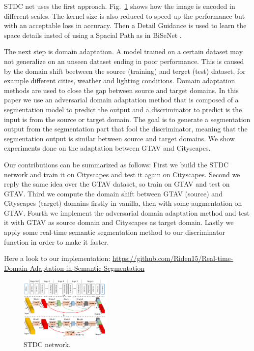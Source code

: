 \documentclass[conference]{IEEEtran}
\begin{document}
STDC net \cite{b1} uses the first approach. Fig.~\ref{stdc_net} shows how the image is encoded in different scales. The kernel size is also reduced
to speed-up the performance but with an acceptable loss in accuracy. Then a Detail Guidance is used to learn the space details insted of 
using a Spacial Path as in BiSeNet \cite{b2}.

The next step is domain adaptation. A model trained on a certain dataset may not generalize on an unseen dataset ending in poor performance.
This is caused by the domain shift beetween the source (training) and terget (test) dataset, for example different cities, weather and 
lighting conditions. Domain adaptation methods are used to close the gap between source and target domains. In this paper we use an 
adversarial domain adaptation method \cite{b3} that is composed of a segmentation model to predict the output and a discriminator to
predict is the input is from the source or target domain. The goal is to generate a segmentation output from the segmentation part that 
fool the discriminator, meaning that the segmentation output is similar between source and target domains. We show experiments done on 
the adaptation between GTAV and Cityscapes.

Our contributions can be summarized as follows:
First we build the STDC network and train it on Cityscapes and test it again on Cityscapes. Second we reply the same idea over the 
GTAV dataset, so train on GTAV and test on GTAV. Third we compute the domain shift between GTAV (source) and Cityscapes (target) domains
firstly in vanilla, then with some augmentation on GTAV. Fourth we implement the adversarial domain adaptation method and test it 
with GTAV as source domain and Cityscapes as target domain. Lastly we apply some real-time semantic segmentation method to our 
discriminator function in order to make it faster. 

Here a look to our implementation: \url{https://github.com/Riden15/Real-time-Domain-Adaptation-in-Semantic-Segmentation}

\begin{figure}[tp]
\centerline{\includegraphics[width=0.4\textwidth]{figures/Figure1-STDCnet.png}}
\caption{STDC network.}
\label{stdc_net}
\end{figure}
\end{document}
